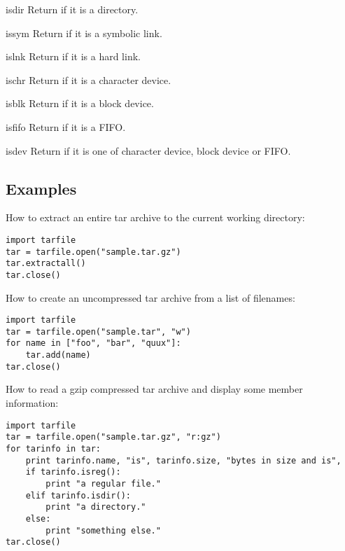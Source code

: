 \begin{methoddesc}{isdir}{}
    Return  if it is a directory.
\end{methoddesc}

\begin{methoddesc}{issym}{}
    Return  if it is a symbolic link.
\end{methoddesc}

\begin{methoddesc}{islnk}{}
    Return  if it is a hard link.
\end{methoddesc}

\begin{methoddesc}{ischr}{}
    Return  if it is a character device.
\end{methoddesc}

\begin{methoddesc}{isblk}{}
    Return  if it is a block device.
\end{methoddesc}

\begin{methoddesc}{isfifo}{}
    Return  if it is a FIFO.
\end{methoddesc}

\begin{methoddesc}{isdev}{}
    Return  if it is one of character device, block
    device or FIFO.
\end{methoddesc}


\subsection{Examples \label{tar-examples}}

How to extract an entire tar archive to the current working directory:
\begin{verbatim}
import tarfile
tar = tarfile.open("sample.tar.gz")
tar.extractall()
tar.close()
\end{verbatim}

How to create an uncompressed tar archive from a list of filenames:
\begin{verbatim}
import tarfile
tar = tarfile.open("sample.tar", "w")
for name in ["foo", "bar", "quux"]:
    tar.add(name)
tar.close()
\end{verbatim}

How to read a gzip compressed tar archive and display some member information:
\begin{verbatim}
import tarfile
tar = tarfile.open("sample.tar.gz", "r:gz")
for tarinfo in tar:
    print tarinfo.name, "is", tarinfo.size, "bytes in size and is",
    if tarinfo.isreg():
        print "a regular file."
    elif tarinfo.isdir():
        print "a directory."
    else:
        print "something else."
tar.close()
\end{verbatim}

